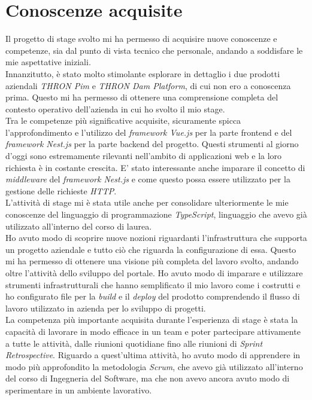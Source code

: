\section{Conoscenze acquisite}
Il progetto di stage svolto mi ha permesso di acquisire nuove conoscenze e competenze, sia dal punto di vista tecnico che personale, andando a soddisfare le mie aspettative iniziali.\\
Innanzitutto, è stato molto stimolante esplorare in dettaglio i due prodotti aziendali \textit{THRON Pim} e \textit{THRON Dam Platform}, di cui non ero a conoscenza prima. 
Questo mi ha permesso di ottenere una comprensione completa del contesto operativo dell'azienda in cui ho svolto il mio stage.\\
Tra le competenze più significative acquisite, sicuramente spicca l'approfondimento e l'utilizzo del \textit{framework Vue.js} per la parte frontend e del \textit{framework Nest.js} per la parte backend del progetto.
Questi strumenti al giorno d'oggi sono estremamente rilevanti nell'ambito di applicazioni web e la loro richiesta è in costante crescita.
E' stato interessante anche imparare il concetto di \textit{middleware} del \textit{framework Nest.js} e come questo possa essere utilizzato per la gestione delle richieste \textit{HTTP}.\\
L'attività di stage mi è stata utile anche per consolidare ulteriormente le mie conoscenze del linguaggio di programmazione \textit{TypeScript}, linguaggio che avevo già utilizzato all'interno del corso di laurea.\\
Ho avuto modo di scoprire nuove nozioni riguardanti l'infrastruttura che supporta un progetto aziendale e tutto ciò che riguarda la configurazione di essa. Questo mi ha permesso di ottenere una visione
più completa del lavoro svolto, andando oltre l'attività dello sviluppo del portale.
Ho avuto modo di imparare e utilizzare strumenti infrastrutturali che hanno semplificato il mio lavoro come i costrutti e ho configurato file per la \textit{build} e il \textit{deploy} del prodotto comprendendo il flusso di lavoro utilizzato in azienda per lo sviluppo di progetti.\\
La competenza più importante acquisita durante l'esperienza di stage è stata la capacità di lavorare in modo efficace in un team e poter partecipare attivamente a tutte le attività, dalle riunioni quotidiane fino alle riunioni di \textit{Sprint Retrospective}.
Riguardo a quest'ultima attività, ho avuto modo di apprendere in modo più approfondito la metodologia \textit{Scrum}, che avevo già utilizzato all'interno del corso di Ingegneria del Software, ma che non avevo ancora avuto modo di sperimentare in un ambiente lavorativo.

